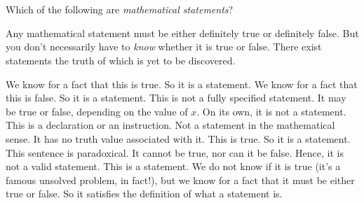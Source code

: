 \section{\problemhead}
\begin{problem}
  [Statements]
  Which of the following are \emph{mathematical statements}?
  \begin{enumerate}
  \end{enumerate}

  \begin{hint}
    Any mathematical statement must be either definitely true or definitely
    false. But you don't necessarily have to \emph{know} whether it is true or
    false. There exist statements the truth of which is yet to be discovered.
  \end{hint}

  \begin{sol}
  \begin{enumerate}
     We know for a fact that this is true. So it is a statement.
     We know for a fact that this is false. So it is a statement.
     This is not a fully specified statement. It may be true or
          false, depending on the value of \(x\). On its own, it is not a statement.
     This is a declaration or an instruction. Not a
          statement in the mathematical sense. It has no truth value associated
          with it.
     This is true. So it
          is a statement.
     This sentence is paradoxical. It cannot be
          true, nor can it be false. Hence, it is not a valid statement.
          This is a statement. We do not know if it is true (it's a famous
          unsolved problem, in fact!), but we know for a fact that it must be
          either true or false. So it satisfies the definition of what a
          statement is.
  \end{enumerate}
  \end{sol}
\end{problem}

